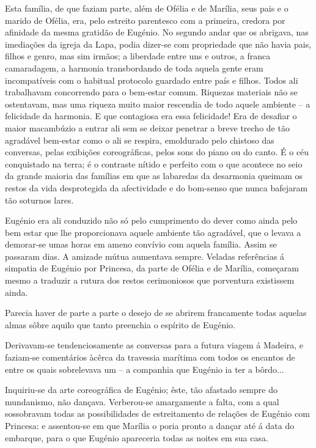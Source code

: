 \documentclass[9pt]{article}
\begin{document}
Esta fa\-mí\-lia, de que faziam parte, além de Ofélia e de Marília, seus
pais e o marido de Ofélia, era, pelo estreito parentesco com a primeira,
credora por afinidade da mesma gratidão de Eugé\-nio. No segundo andar que
os abrigava, nas imedia\-ções da igreja da Lapa, podia dizer-se com propriedade que não havia pais, fi\-lhos e genro, mas sim irmãos; a liberdade entre
uns e outros, a franca camaradagem, a harmonia transbordando de toda aquela gente eram incompatíveis com o habitual protocolo guardado entre país
e fi\-lhos. Todos ali traba\-lhavam concorrendo para o bem-estar comum. Riquezas materiais não se ostentavam, mas uma riqueza muito maior rescendia
de todo aquele ambiente -- a felicidade da harmonia. E que contagiosa era
essa felicidade! Era de desafiar o maior macambúzio a entrar ali sem
se deixar penetrar a breve trecho de tão a\-gra\-dá\-vel bem-estar como o
ali se respira, emoldurado pelo chistoso das conversas, pelas exibi\-ções
coreográfi\-cas, pelos sons do piano ou do canto. É o céu conquistado na
terra; é o contraste nítido e perfeito com o que acontece no seio da gran\-de maioria das fa\-mí\-lias em que as labaredas da desarmonia queimam os restos da vida desprotegida da afectividade e do bom-senso que nunca bafejaram tão soturnos lares.

Eugé\-nio era ali conduzido não só pelo cumprimento do dever como
ainda pelo bem estar que lhe proporcionava aquele ambiente tão a\-gra\-dá\-vel,
que o levava a demorar-se umas horas em ameno con\-ví\-vio com aquela fa\-mí\-lia.
Assim se passaram dias. A amizade mútua aumentava sempre. Veladas referências á simpatia de Eugé\-nio por Princesa, da parte de Ofélia e de Marília, começaram mesmo a traduzir a rutura dos restos cerimoniosos que
porventura existissem ainda.

Parecia haver de parte a parte o desejo de se abrirem francamente
todas aquelas almas sôbre aquilo que tanto preenchia o espírito de Eugé\-nio.

Derivavam-se tendenciosamente as conversas para a futura viagem á
Madeira, e faziam-se comentários àcêrca da travessia marítima com todos
os encantos de entre os quais sobrelevava um -- a companhia que Eugé\-nio
ia ter a bôrdo...

Inquiriu-se da arte coreográfi\-ca de Eugé\-nio; êste, tão afastado sempre do mundanismo, não dan\-çava. Verberou-se amargamente a falta, com a
qual sossobravam todas as possibilidades de estreitamento de rela\-ções de
Eugé\-nio com Princesa: e assentou-se em que Marília o poria pronto a dan\-çar até á data do embarque, para o que Eugé\-nio apareceria todas as noites em sua casa.
\end{document}
